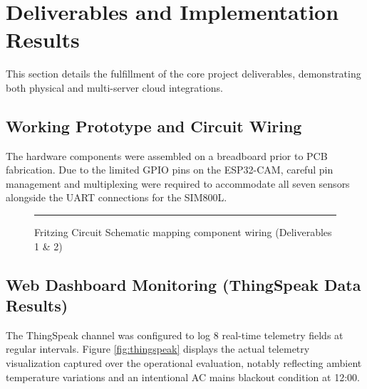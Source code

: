 \documentclass[12pt,a4paper]{article}
\begin{document}
\section{Deliverables and Implementation Results}
This section details the fulfillment of the core project deliverables, demonstrating both physical and multi-server cloud integrations.

\subsection{Working Prototype and Circuit Wiring}
The hardware components were assembled on a breadboard prior to PCB fabrication. Due to the limited GPIO pins on the ESP32-CAM, careful pin management and multiplexing were required to accommodate all seven sensors alongside the UART connections for the SIM800L. 

\begin{figure}[H]
    \centering
    \rule{8cm}{4cm} %
    \caption{Fritzing Circuit Schematic mapping component wiring (Deliverables 1 \& 2)}
    \label{fig:fritzing}
\end{figure}

\subsection{Web Dashboard Monitoring (ThingSpeak Data Results)}
The ThingSpeak channel was configured to log 8 real-time telemetry fields at regular intervals. Figure \ref{fig:thingspeak} displays the actual telemetry visualization captured over the operational evaluation, notably reflecting ambient temperature variations and an intentional AC mains blackout condition at 12:00.
\end{document}
